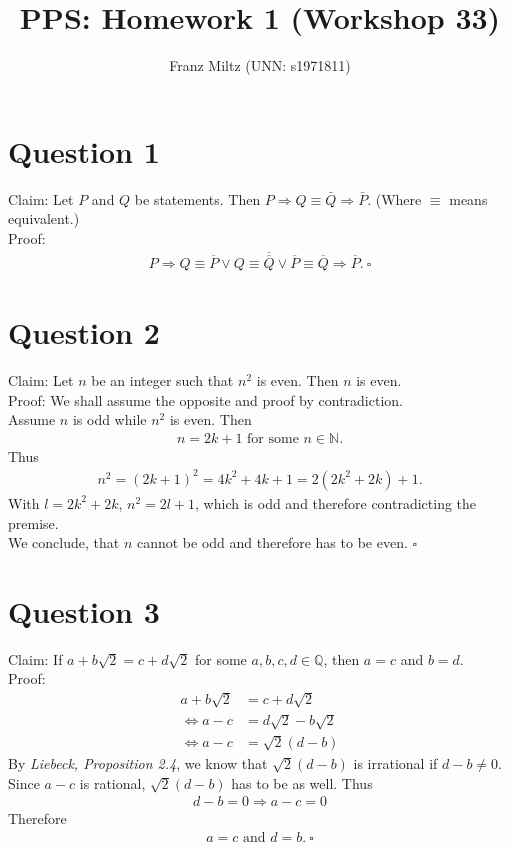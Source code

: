 \documentclass{article}
\title{PPS: Homework 1 (Workshop 33)}
\author{Franz Miltz (UNN: s1971811)}
\newcommand*\lneg[1]{\overline{#1}}
\begin{document}
\maketitle
\section*{Question 1}
Claim: Let $P$ and $Q$ be statements. Then $P\Rightarrow Q\equiv \bar{Q}\Rightarrow \bar{P}$. (Where $\equiv$ means equivalent.)\\
Proof:
\begin{align*}
  P\Rightarrow Q\equiv\lneg{P}\vee Q\equiv \lneg{\lneg{Q}}\vee \lneg{P}\equiv\lneg{Q}\Rightarrow\lneg{P}.\:\square
\end{align*}
\section*{Question 2}
Claim: Let $n$ be an integer such that $n^2$ is even. Then $n$ is even.\\
Proof: We shall assume the opposite and proof by contradiction.\\
Assume $n$ is odd while $n^2$ is even. Then
\begin{align*}
  n=2k+1 \text{ for some } n\in\mathbb{N}. 
\end{align*} 
Thus
\begin{align*}
  n^2=(2k+1)^2=4k^2+4k+1=2(2k^2+2k)+1.
\end{align*}
With $l=2k^2+2k$, $n^2=2l+1$, which is odd and therefore contradicting the premise.\\
We conclude, that $n$ cannot be odd and therefore has to be even. $\square$
\section*{Question 3}
Claim: If $a+b\sqrt{2}=c+d\sqrt{2}$ for some $a,b,c,d\in\mathbb{Q}$, then $a=c$ and $b=d$.\\
Proof:
\begin{align*}
  a+b\sqrt{2}&=c+d\sqrt{2}\\
  \Leftrightarrow a-c&=d\sqrt{2}-b\sqrt{2}\\
  \Leftrightarrow a-c&=\sqrt{2}(d-b)
\end{align*}
By \emph{Liebeck, Proposition 2.4}, we know that $\sqrt{2}(d-b)$ is irrational if $d-b\not=0$. Since $a-c$ is rational, $\sqrt{2}(d-b)$ has to be as well. Thus
\begin{align*}
  d-b=0 \Rightarrow a-c=0
\end{align*}
Therefore
\begin{align*}
  a=c \text{ and } d=b.\:\square
\end{align*}
\end{document}
